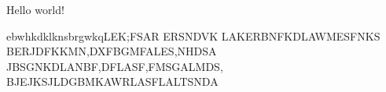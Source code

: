 \documentclass[a4paper, 12pt]{article}
\begin{document}
    Hello world!

    ebwhkdklknsbrgwkqLEK;FSAR
    ERSNDVK LAKERBNFKDLAWMESFNKS
    BERJDFKKMN,DXFBGMFALES,NHDSA
    JBSGNKDLANBF,DFLASF,FMSGALMDS,
    BJEJKSJLDGBMKAWRLASFLALTSNDA
\end{document}
